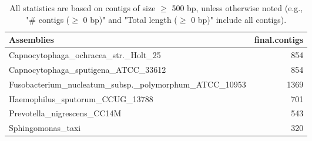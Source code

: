 \documentclass[12pt,a4paper]{article}
\begin{document}
\begin{table}[ht]
\begin{center}
\caption{All statistics are based on contigs of size $\geq$ 500 bp, unless otherwise noted (e.g., "\# contigs ($\geq$ 0 bp)" and "Total length ($\geq$ 0 bp)" include all contigs).}
\begin{tabular}{|l*{1}{|r}|}
\hline
Assemblies & final.contigs \\ \hline
Capnocytophaga\_ochracea\_str.\_Holt\_25 & 854 \\ \hline
Capnocytophaga\_sputigena\_ATCC\_33612 & 854 \\ \hline
Fusobacterium\_nucleatum\_subsp.\_polymorphum\_ATCC\_10953 & 1369 \\ \hline
Haemophilus\_sputorum\_CCUG\_13788 & 701 \\ \hline
Prevotella\_nigrescens\_CC14M & 543 \\ \hline
Sphingomonas\_taxi & 320 \\ \hline
\end{tabular}
\end{center}
\end{table}
\end{document}
